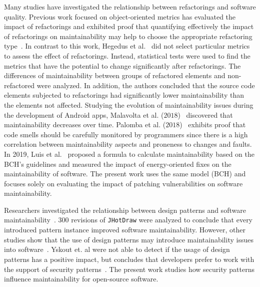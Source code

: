 \documentclass[10pt,conference]{IEEEtran}
\begin{document}
Many studies have investigated the relationship between refactorings and
software quality. Previous work focused on object-oriented metrics has evaluated the
impact of refactorings and exhibited proof that quantifying effectively the
impact of refactorings on maintainability may help to choose the appropriate
refactoring type~\cite{1167822}. In contrast to this work, Hegedus et
al.~\cite{HEGEDUS2018313} did not select particular metrics to assess the effect
of refactorings. Instead, statistical tests were used to find the metrics that
have the potential to change significantly after refactorings. The differences
of maintainability between groups of refactored elements and non-refactored were
analyzed. In addition, the authors concluded that the source code elements
subjected to refactorings had significantly lower maintainability than the
elements not affected. Studying the evolution of maintainability issues during
the development of Android apps, Malavolta et al. ($2018$)~\cite{8530041}
discovered that maintainability decreases over time. Palomba et al.
($2018$)~\cite{Palomba:2018:DIM:3231288.3231337} exhibits proof that code smells
should be carefully monitored by programmers since there is a high correlation
between maintainability aspects and proneness to changes and faults. In 2019, Luis et al.~\cite{cruz2019energyoriented} proposed a formula to calculate maintainability based on the BCH's guidelines and measured the impact of energy-oriented fixes on the maintainability of software.
The present
work uses the same model (BCH) and focuses solely on evaluating the impact of
patching vulnerabilities on software maintainability.

Researchers investigated the relationship between design patterns and software
maintainability~\cite{10.1007/978-3-642-35267-6-18}. $300$ revisions of
\texttt{JHotDraw} were analyzed to conclude that every introduced pattern
instance improved software maintainability. However, other studies show that the
use of design patterns may introduce maintainability issues into
software~\cite{4493325}. Yskout et. al were not able to detect if the usage of design patterns has a positive impact, but concludes that developers prefer to work with the support of security patterns~\cite{8077802}. The present work studies how security patterns influence maintainability for open-source software.
\end{document}

